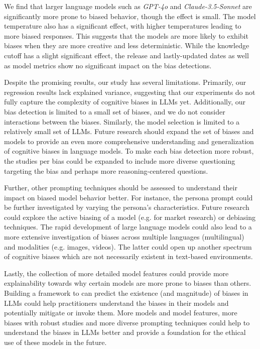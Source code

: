\par We find that larger language models such as \textit{GPT-4o} and \textit{Claude-3.5-Sonnet} are significantly more prone to biased behavior, though the effect is small. The model temperature also has a significant effect, with higher temperatures leading to more biased responses. This suggests that the models are more likely to exhibit biases when they are more creative and less deterministic. While the knowledge cutoff has a slight significant effect, the release and lastly-updated dates as well as model metrics show no significant impact on the bias detections.

\par Despite the promising results, our study has several limitations. Primarily, our regression results lack explained variance, suggesting that our experiments do not fully capture the complexity of cognitive biases in LLMs yet. Additionally, our bias detection is limited to a small set of biases, and we do not consider interactions between the biases. Similarly, the model selection is limited to a relatively small set of LLMs. Future research should expand the set of biases and models to provide an even more comprehensive understanding and generalization of cognitive biases in language models. To make each bias detection more robust, the studies per bias could be expanded to include more diverse questioning targeting the bias and perhaps more reasoning-centered questions.

\par Further, other prompting techniques should be assessed to understand their impact on biased model behavior better. For instance, the persona prompt could be further investigated by varying the persona's characteristics. Future research could explore the active biasing of a model (e.g. for market research) or debiasing techniques. The rapid development of large language models could also lead to a more extensive investigation of biases across multiple languages (multilingual) and modalities (e.g. images, videos). The latter could open up another spectrum of cognitive biases which are not necessarily existent in text-based environments.

\par Lastly, the collection of more detailed model features could provide more explainability towards why certain models are more prone to biases than others. Building a framework to can predict the existence (and magnitude) of biases in LLMs could help practitioners understand the biases in their models and potentially mitigate or invoke them. More models and model features, more biases with robust studies and more diverse prompting techniques could help to understand the biases in LLMs better and provide a foundation for the ethical use of these models in the future.
